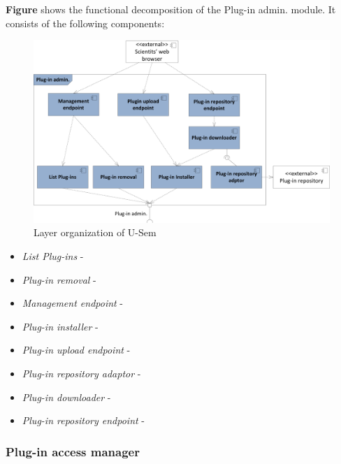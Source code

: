 \textbf{Figure} shows the functional decomposition of the Plug-in admin. module. It consists of the following components:

\begin{figure}[h!]
  \centering
  	\includegraphics[scale=0.75]{plug-in/layers/admin-func.png}
  \caption{Layer organization of U-Sem}
\end{figure}

\begin{itemize}

\item \textit{List Plug-ins} - 

\item \textit{Plug-in removal} - 

\item \textit{Management endpoint} - 

\item \textit{Plug-in installer} - 

\item \textit{Plug-in upload endpoint} - 

\item \textit{Plug-in repository adaptor} - 

\item \textit{Plug-in downloader} - 

\item \textit{Plug-in repository endpoint} - 

\end{itemize}


\subsubsection{Plug-in access manager}

